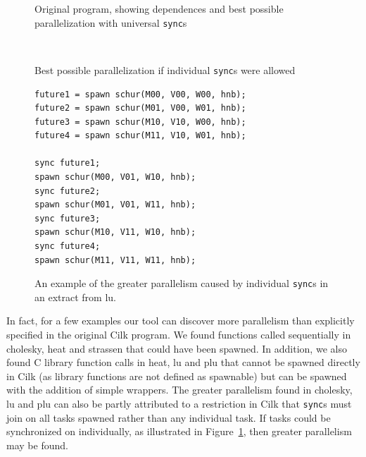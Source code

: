 \begin{figure}
  \begin{center}
  \scriptsize
  \begin{SubFloat}{\label{cilk-sync:without}Original program, showing dependences and best possible parallelization with universal \texttt{sync}s}
    \begin{minipage}{3in}
      
    \end{minipage}%
  \end{SubFloat}%
\\
  \begin{SubFloat}{\label{cilk-sync:with}Best possible parallelization if individual \texttt{sync}s were allowed}
    \begin{minipage}{3in}
      \begin{verbatim}
future1 = spawn schur(M00, V00, W00, hnb);
future2 = spawn schur(M01, V00, W01, hnb);
future3 = spawn schur(M10, V10, W00, hnb);
future4 = spawn schur(M11, V10, W01, hnb);

sync future1;
spawn schur(M00, V01, W10, hnb);
sync future2;
spawn schur(M01, V01, W11, hnb);
sync future3;
spawn schur(M10, V11, W10, hnb);
sync future4;
spawn schur(M11, V11, W11, hnb);
      \end{verbatim}
    \end{minipage}%
  \end{SubFloat}%
  \end{center}
  \caption{An example of the greater parallelism caused by individual \texttt{sync}s in an extract from \textsf{lu}.}
  \label{cilk-sync}
\end{figure}


In fact, for a few examples our tool can discover more parallelism than explicitly specified in the original Cilk program.
We found functions called sequentially in \textsf{cholesky}, \textsf{heat} and \textsf{strassen} that could have been spawned.
In addition, we also found C library function calls in \textsf{heat}, \textsf{lu} and \textsf{plu} that cannot be spawned directly in Cilk (as library functions are not defined as spawnable) but can be spawned with the addition of simple wrappers.
The greater parallelism found in \textsf{cholesky}, \textsf{lu} and \textsf{plu} can also be partly attributed to a restriction in Cilk that \texttt{sync}s must join on all tasks spawned rather than any individual task.
If tasks could be synchronized on individually, as illustrated in Figure~\ref{cilk-sync}, then greater parallelism may be found.

